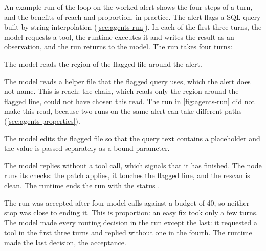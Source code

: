 An example run of the loop on the worked alert shows the four steps of a turn, and the benefits of
reach and proportion, in practice. The alert flags a SQL query built by string interpolation
(\cref{sec:agents-run}). In each of the first three turns, the model requests a tool, the runtime
executes it and writes the result as an observation, and the run returns to the model. The run
takes four turns:
\be
\item The model reads the region of the flagged file around the alert.
\item The model reads a helper file that the flagged query uses, which the alert does not name.
This is reach: the chain, which reads only the region around the flagged line, could not have
chosen this read. The run in \cref{fig:agents-run} did not make this read, because two runs on the
same alert can take different paths (\cref{sec:agents-properties}).
\item The model edits the flagged file so that the query text contains a placeholder and the value
is passed separately as a bound parameter.
\item The model replies without a tool call, which signals that it has finished. The
 node runs its checks: the patch applies, it touches the flagged line, and the
rescan is clean. The runtime ends the run with the status .
\ee

The run was accepted after four model calls against a budget of 40, so neither stop was close to
ending it. This is proportion: an easy fix took only a few turns. The model made every routing
decision in the run except the last: it requested a tool in the first three turns and replied
without one in the fourth. The runtime made the last decision, the acceptance.

